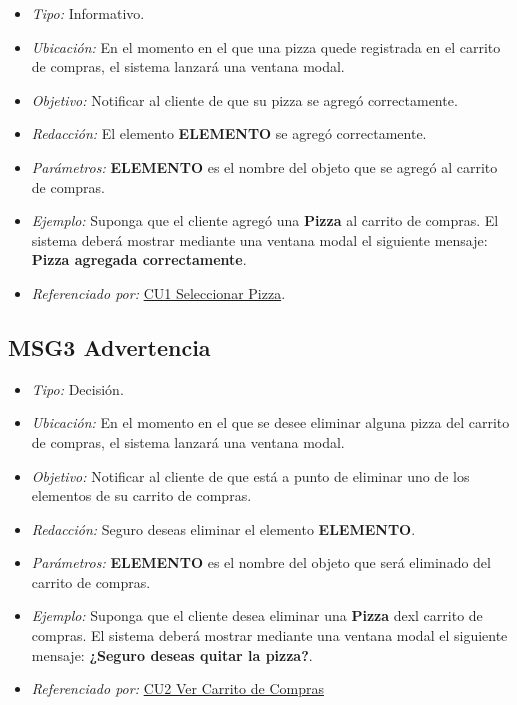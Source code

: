\begin{itemize}
	
	\item \textit{Tipo:} Informativo.
	
	\item\textit{Ubicación:}  En el momento en el que una pizza quede registrada en el carrito de compras, el sistema lanzará una ventana modal.
	
	\item \textit{Objetivo:} Notificar al cliente de que su pizza se agregó correctamente.
	
	\item \textit{Redacción:} El elemento \textbf{ELEMENTO} se agregó correctamente.
	
	\item \textit{Parámetros:} \textbf{ELEMENTO} es el nombre del objeto que se agregó al carrito de compras.
	
	\item \textit{Ejemplo:} Suponga que el cliente agregó una \textbf{Pizza} al carrito de compras. El sistema deberá mostrar mediante una ventana modal el siguiente mensaje: \textbf{Pizza agregada correctamente}.
	
	\item \textit{Referenciado por:} \hyperlink{CU1}{CU1 Seleccionar Pizza}.
	
\end{itemize}

\hypertarget{MSG3:Advertencia}{}
\subsection{MSG3 Advertencia}

\begin{itemize}
	
	\item \textit{Tipo:} Decisión.
	
	\item\textit{Ubicación:}  En el momento en el que se desee eliminar alguna pizza del carrito de compras, el sistema lanzará una ventana modal.
	
	\item \textit{Objetivo:} Notificar al cliente de que está a punto de eliminar uno de los elementos de su carrito de compras.
	
	\item \textit{Redacción:} Seguro deseas eliminar el elemento \textbf{ELEMENTO}.
	
	\item \textit{Parámetros:} \textbf{ELEMENTO} es el nombre del objeto que será eliminado del carrito de compras.
	
	\item \textit{Ejemplo:} Suponga que el cliente desea eliminar una \textbf{Pizza} dexl carrito de compras. El sistema deberá mostrar mediante una ventana modal el siguiente mensaje: \textbf{¿Seguro deseas quitar la pizza?}.
	
	\item \textit{Referenciado por:} \hyperlink{CU2}{CU2 Ver Carrito de Compras}
	
\end{itemize}

